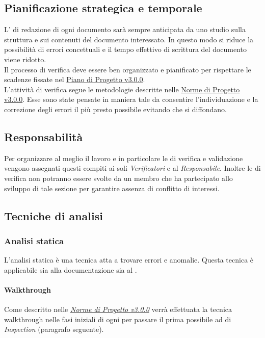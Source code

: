 \documentclass{scalatekids-article}
\begin{document}
\subsection{Pianificazione strategica e temporale}
L' di redazione di ogni documento sarà sempre anticipata da uno studio sulla struttura e sui contenuti del documento interessato. In questo modo si riduce la possibilità di errori concettuali e il tempo effettivo di scrittura del documento viene ridotto.\\
Il processo di verifica deve essere ben organizzato e pianificato per rispettare le scadenze fissate nel \href{run:./PianoDiProgetto\_v3.0.0.pdf}{Piano di Progetto v3.0.0}.\\
L'attività di verifica segue le metodologie descritte nelle \href{run:../Interni/NormeDiProgetto\_v3.0.0.pdf}{Norme di Progetto v3.0.0}. Esse sono state pensate in maniera tale da consentire l'individuazione e la correzione degli errori il più presto possibile evitando che si diffondano.
\subsection{Responsabilità}
Per organizzare al meglio il lavoro e in particolare le  di verifica e validazione vengono assegnati questi compiti ai soli \textit{Verificatori} e al \textit{Responsabile}. Inoltre le  di verifica non potranno essere svolte da un membro che ha partecipato allo sviluppo di tale sezione per garantire assenza di conflitto di interessi.
\subsection{Tecniche di analisi}
\label{sec:TecnicheDiAnalisi}
\subsubsection{Analisi statica}
L'analisi statica è una tecnica atta a trovare errori e anomalie. Questa tecnica è applicabile sia alla documentazione sia al .
\paragraph{Walkthrough}
\label{sec:walkthrough}Come descritto nelle \textit{\href{run:../Interni/NormeDiProgetto_v3.0.0.pdf}{Norme di Progetto v3.0.0}} verrà effettuata la tecnica walkthrough nelle fasi iniziali di ogni  per passare il prima possibile ad  di \textit{Inspection} (paragrafo seguente).
\end{document}
